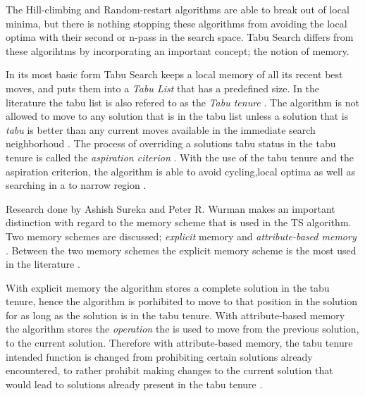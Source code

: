 The Hill-climbing and Random-restart algorithms are able to break out of local minima, but there is nothing stopping these algorithms from avoiding the local optima with their second or n-pass in the search space. Tabu Search differs from these algorihtms by incorporating an important concept; the notion of memory.

In its most basic form Tabu Search keeps a local memory of all its recent best moves, and puts them into a \emph{Tabu List} that has a predefined size. In the literature the tabu list is also refered to as the \emph{Tabu tenure} \cite{TSHazardous,TabuCarryOver,ReactiveTabuVHR,TabuParameterization}. The algorithm is not allowed to move to any solution that is in the tabu list unless a solution that is \emph{tabu} is better than any current moves available in the immediate search neighborhoud \cite{TSHazardous,TabuCarryOver,ReactiveTabuVHR,TabuParameterization}. The process of overriding a solutions tabu status in the tabu tenure is called the \emph{aspiration citerion} \cite{TSHazardous,TabuCarryOver,ReactiveTabuVHR,TabuParameterization}. With the use of the tabu tenure and the aspiration criterion, the algorithm is able to avoid cycling,local optima as well as searching in a to narrow region \cite{TabuSingleMachineScheduling}.

Research done by Ashish Sureka and Peter R. Wurman makes an important distinction with regard to the memory scheme that is used in the TS algorithm. Two memory schemes are discussed; \emph{explicit} memory and \emph{attribute-based memory} \cite{TabuBiddingStrats,TabuFormGames}. Between the two memory schemes the explicit memory scheme is the most used in the literature \cite{TabuVechicleRoutingWithTimeWindows}.

With explicit memory the algorithm stores a complete solution in the tabu tenure, hence the algorithm is porhibited to move to that position in the solution for as long as the solution is in the tabu tenure\cite{TabuBiddingStrats,TabuFormGames}. With attribute-based memory the algorithm stores the \emph{operation} the is used to move from the previous solution, to the current solution\cite{TabuBiddingStrats,TabuFormGames}. Therefore with attribute-based memory, the tabu tenure intended function is changed from prohibiting certain solutions already encountered, to rather prohibit making changes to the current solution that would lead to solutions already present in the tabu tenure \cite{TabuBiddingStrats,TabuFormGames}.

